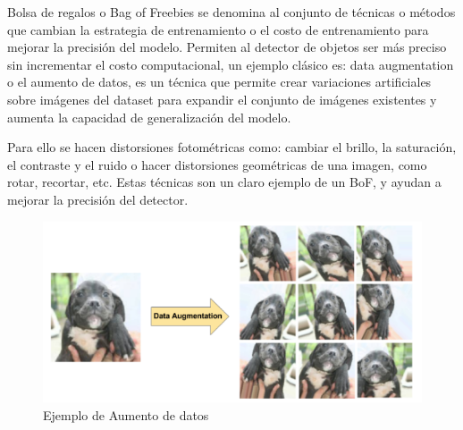 Bolsa de regalos o Bag of Freebies se denomina al conjunto de técnicas o métodos que cambian la estrategia de entrenamiento o el costo de entrenamiento para mejorar la precisión del modelo. Permiten al detector de objetos ser más preciso sin incrementar el costo computacional, un ejemplo clásico es: data augmentation o el aumento de datos, es un técnica que permite crear variaciones artificiales sobre imágenes del dataset para expandir el conjunto de imágenes existentes y aumenta la capacidad de generalización del modelo.

Para ello se hacen distorsiones fotométricas como: cambiar el brillo, la saturación, el contraste y el ruido o hacer distorsiones geométricas de una imagen, como rotar, recortar, etc. Estas técnicas son un claro ejemplo de un BoF, y ayudan a mejorar la precisión del detector.

\begin{figure}[h!]
    \centering
    \includegraphics[width=1\textwidth]{img/dataAugmentation.png}
    \caption{Ejemplo de Aumento de datos \cite{dataaug}}
    \label{fig:data-augmentation-ejemplo}
\end{figure}

